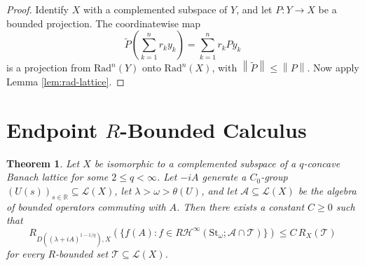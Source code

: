 \documentclass[11pt]{article}
\newtheorem{theorem}{Theorem}
\newcommand{\R}{\mathbb R}
\newcommand{\St}{\mathrm{St}}
\newcommand{\Rad}{\mathrm{Rad}}
\newcommand{\cL}{\mathcal L}
\newcommand{\cA}{\mathcal A}
\newcommand{\HT}{\mathcal H}
\newcommand{\norm}[1]{\left\|#1\right\|}
\begin{document}
\begin{proof}
Identify \(X\) with a complemented subspace of \(Y\), and let \(P:Y\to X\) be a
bounded projection.  The coordinatewise map
\[
        \widetilde P\left(\sum_{k=1}^n r_k y_k\right)
        =
        \sum_{k=1}^n r_k P y_k
\]
is a projection from \(\Rad^n(Y)\) onto \(\Rad^n(X)\), with
\(\norm{\widetilde P}\le\norm{P}\).  Now apply Lemma \ref{lem:rad-lattice}.
\end{proof}

\section*{Endpoint \(R\)-Bounded Calculus}

\begin{theorem}\label{thm:endpoint}
Let \(X\) be isomorphic to a complemented subspace of a \(q\)-concave Banach
lattice for some \(2\le q<\infty\).  Let \(-iA\) generate a \(C_0\)-group
\((U(s))_{s\in\R}\subseteq\cL(X)\), let \(\lambda>\omega>\theta(U)\), and let
\(\cA\subseteq\cL(X)\) be the algebra of bounded operators commuting with \(A\).
Then there exists a constant \(C\ge0\) such that
\[
 R_{D((\lambda+iA)^{1-1/q}),X}
 \left(\{f(A): f\in R\HT^\infty(\St_\omega;\cA\cap\mathcal T)\}\right)
 \le C\,R_X(\mathcal T)
\]
for every \(R\)-bounded set \(\mathcal T\subseteq\cL(X)\).
\end{theorem}
\end{document}
